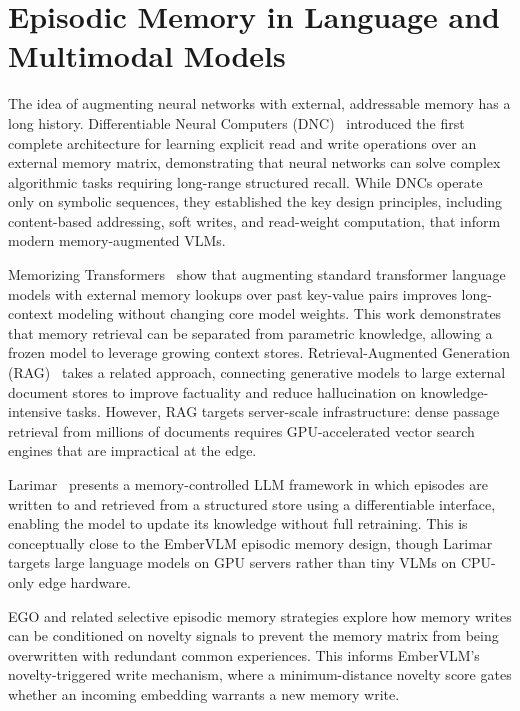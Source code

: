 \section[Episodic Memory in Neural Models]{Episodic Memory in Language and Multimodal Models}
\label{sec:related_memory}

The idea of augmenting neural networks with external, addressable memory has a long history. Differentiable Neural Computers (DNC)~\cite{graves2016dnc} introduced the first complete architecture for learning explicit read and write operations over an external memory matrix, demonstrating that neural networks can solve complex algorithmic tasks requiring long-range structured recall. While DNCs operate only on symbolic sequences, they established the key design principles, including content-based addressing, soft writes, and read-weight computation, that inform modern memory-augmented VLMs.

Memorizing Transformers~\cite{wu2022memorising} show that augmenting standard transformer language models with external memory lookups over past key-value pairs improves long-context modeling without changing core model weights. This work demonstrates that memory retrieval can be separated from parametric knowledge, allowing a frozen model to leverage growing context stores. Retrieval-Augmented Generation (RAG)~\cite{lewis2020rag} takes a related approach, connecting generative models to large external document stores to improve factuality and reduce hallucination on knowledge-intensive tasks. However, RAG targets server-scale infrastructure: dense passage retrieval from millions of documents requires GPU-accelerated vector search engines that are impractical at the edge.

Larimar~\cite{das2024larimar} presents a memory-controlled LLM framework in which episodes are written to and retrieved from a structured store using a differentiable interface, enabling the model to update its knowledge without full retraining. This is conceptually close to the EmberVLM episodic memory design, though Larimar targets large language models on GPU servers rather than tiny VLMs on CPU-only edge hardware.

EGO and related selective episodic memory strategies explore how memory writes can be conditioned on novelty signals to prevent the memory matrix from being overwritten with redundant common experiences. This informs EmberVLM's novelty-triggered write mechanism, where a minimum-distance novelty score gates whether an incoming embedding warrants a new memory write.

